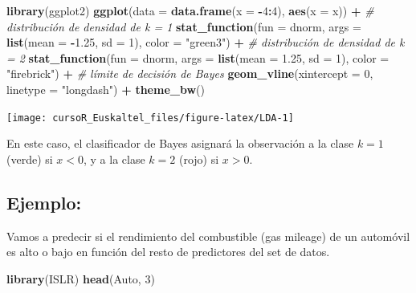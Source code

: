 \documentclass[]{book}
\newenvironment{Shaded}{\begin{snugshade}}{\end{snugshade}}
\newcommand{\KeywordTok}[1]{\textcolor[rgb]{0.13,0.29,0.53}{\textbf{#1}}}
\newcommand{\DataTypeTok}[1]{\textcolor[rgb]{0.13,0.29,0.53}{#1}}
\newcommand{\DecValTok}[1]{\textcolor[rgb]{0.00,0.00,0.81}{#1}}
\newcommand{\FloatTok}[1]{\textcolor[rgb]{0.00,0.00,0.81}{#1}}
\newcommand{\StringTok}[1]{\textcolor[rgb]{0.31,0.60,0.02}{#1}}
\newcommand{\CommentTok}[1]{\textcolor[rgb]{0.56,0.35,0.01}{\textit{#1}}}
\newcommand{\OperatorTok}[1]{\textcolor[rgb]{0.81,0.36,0.00}{\textbf{#1}}}
\newcommand{\NormalTok}[1]{#1}
\begin{document}
\begin{Shaded}
\begin{Highlighting}[]
\KeywordTok{library}\NormalTok{(ggplot2)}
\KeywordTok{ggplot}\NormalTok{(}\DataTypeTok{data =} \KeywordTok{data.frame}\NormalTok{(}\DataTypeTok{x =} \OperatorTok{-}\DecValTok{4}\OperatorTok{:}\DecValTok{4}\NormalTok{), }\KeywordTok{aes}\NormalTok{(}\DataTypeTok{x =}\NormalTok{ x)) }\OperatorTok{+}
\CommentTok{# distribución de densidad de k = 1}
\KeywordTok{stat_function}\NormalTok{(}\DataTypeTok{fun =}\NormalTok{ dnorm,}
\DataTypeTok{args =} \KeywordTok{list}\NormalTok{(}\DataTypeTok{mean =} \OperatorTok{-}\FloatTok{1.25}\NormalTok{, }\DataTypeTok{sd =} \DecValTok{1}\NormalTok{),}
\DataTypeTok{color =} \StringTok{"green3"}\NormalTok{) }\OperatorTok{+}
\CommentTok{# distribución de densidad de k = 2}
\KeywordTok{stat_function}\NormalTok{(}\DataTypeTok{fun =}\NormalTok{ dnorm,}
\DataTypeTok{args =} \KeywordTok{list}\NormalTok{(}\DataTypeTok{mean =} \FloatTok{1.25}\NormalTok{, }\DataTypeTok{sd =} \DecValTok{1}\NormalTok{),}
\DataTypeTok{color =} \StringTok{"firebrick"}\NormalTok{) }\OperatorTok{+}\StringTok{ }\CommentTok{# límite de decisión de Bayes}
\KeywordTok{geom_vline}\NormalTok{(}\DataTypeTok{xintercept =} \DecValTok{0}\NormalTok{,}
\DataTypeTok{linetype =} \StringTok{"longdash"}\NormalTok{) }\OperatorTok{+}
\KeywordTok{theme_bw}\NormalTok{()}
\end{Highlighting}
\end{Shaded}

\begin{center}\texttt{[image: cursoR\_Euskaltel\_files/figure-latex/LDA-1]} \end{center}

En este caso, el clasificador de Bayes asignará la observación a la
clase \(k = 1\) (verde) si \(x < 0\), y a la clase \(k = 2\) (rojo) si
\(x > 0\).

\subsection{Ejemplo:}\label{ejemplo-1}

Vamos a predecir si el rendimiento del combustible (gas mileage) de un
automóvil es alto o bajo en función del resto de predictores del set de
datos.

\begin{Shaded}
\begin{Highlighting}[]
\KeywordTok{library}\NormalTok{(ISLR)}
\KeywordTok{head}\NormalTok{(Auto, }\DecValTok{3}\NormalTok{)}
\end{Highlighting}
\end{Shaded}
\end{document}

